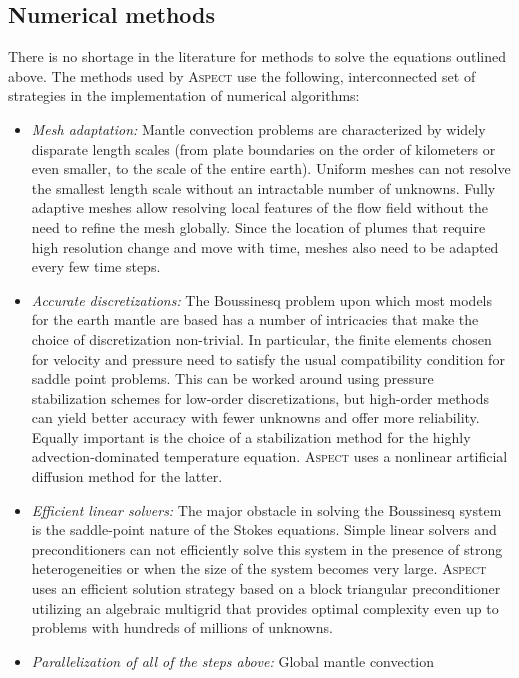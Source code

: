 \documentclass{article}
\newcommand{\aspect}{\textsc{Aspect}}
\begin{document}
\subsection{Numerical methods}

There is no shortage in the literature for methods to solve the equations
outlined above. The methods used by \aspect{} use the following,
interconnected set of strategies in the implementation of numerical
algorithms:
\begin{itemize}
\item \textit{Mesh adaptation:} Mantle convection problems are characterized
  by widely disparate length scales (from plate boundaries on the order of
  kilometers or even smaller, to the scale of the entire earth). Uniform
  meshes can not resolve the smallest length scale without an intractable
  number of unknowns.  Fully adaptive meshes allow resolving local features of
  the flow field without the need to refine the mesh globally. Since the
  location of plumes that require high resolution change and move with time,
  meshes also need to be adapted every few time steps.
\item \textit{Accurate discretizations:} The Boussinesq problem upon which
  most models for the earth mantle are based
  has a number of intricacies that make the choice of discretization
  non-trivial. In particular, the finite elements chosen for velocity and
  pressure need to satisfy the usual compatibility condition for saddle point
  problems. This can be worked around using pressure stabilization schemes for
  low-order discretizations, but high-order methods can yield better accuracy
  with fewer unknowns and offer more reliability. Equally important is the choice of
  a stabilization method for the highly advection-dominated temperature
  equation. \aspect{} uses a nonlinear artificial diffusion method for the latter.
\item \textit{Efficient linear solvers:} The major obstacle in solving the
  Boussinesq system is the saddle-point nature of the Stokes equations. Simple
  linear solvers and preconditioners can not efficiently solve this system in
  the presence of strong heterogeneities or when the size of the system
  becomes very large. \aspect{} uses an efficient solution strategy based on a
  block triangular preconditioner utilizing an algebraic multigrid that
  provides optimal complexity even up to problems with hundreds of millions of
  unknowns.
\item \textit{Parallelization of all of the steps above:} Global mantle convection

\end{itemize}
\end{document}
